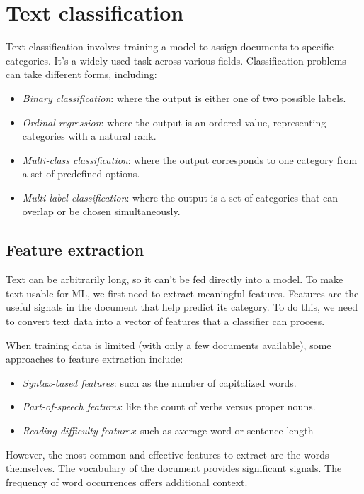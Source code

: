 \section{Text classification}

Text classification involves training a model to assign documents to specific categories. 
It's a widely-used task across various fields. Classification problems can take different forms, including:
\begin{itemize}
    \item \textit{Binary classification}: where the output is either one of two possible labels.
    \item \textit{Ordinal regression}: where the output is an ordered value, representing categories with a natural rank.
    \item \textit{Multi-class classification}: where the output corresponds to one category from a set of predefined options.
    \item \textit{Multi-label classification}: where the output is a set of categories that can overlap or be chosen simultaneously.
\end{itemize}

\subsection{Feature extraction}
Text can be arbitrarily long, so it can't be fed directly into a model.
To make text usable for ML, we first need to extract meaningful features.
Features are the useful signals in the document that help predict its category. 
To do this, we need to convert text data into a vector of features that a classifier can process.

When training data is limited (with only a few documents available), some approaches to feature extraction include:
\begin{itemize}
    \item \textit{Syntax-based features}: such as the number of capitalized words.
    \item \textit{Part-of-speech features}: like the count of verbs versus proper nouns.
    \item \textit{Reading difficulty features}: such as average word or sentence length
\end{itemize}
\noindent However, the most common and effective features to extract are the words themselves. 
The vocabulary of the document provides significant signals.
The frequency of word occurrences offers additional context.

